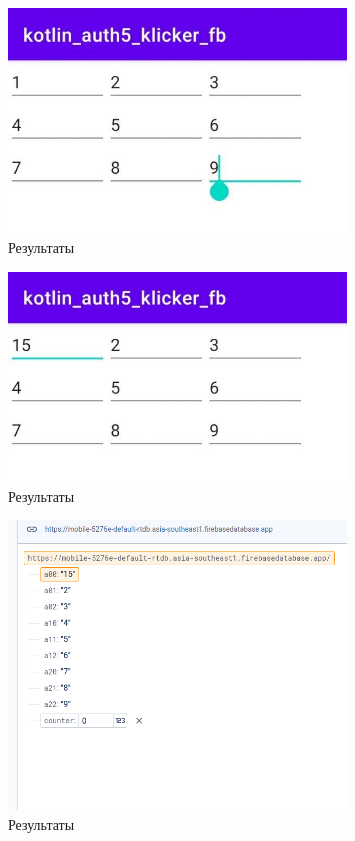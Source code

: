 \documentclass[a4paper, 14pt]{extarticle}
\begin{document}
\begin{figure}[!htb]
	\centering
	\includegraphics[width=0.8\textwidth]{img1}
\caption{Результаты}
\label{fig:img1}
\end{figure}

\begin{figure}[!htb]
	\centering
	\includegraphics[width=0.8\textwidth]{img2}
\caption{Результаты}
\label{fig:img2}
\end{figure}

\begin{figure}[!htb]
	\centering
	\includegraphics[width=0.8\textwidth]{img3}
\caption{Результаты}
\label{fig:img3}
\end{figure}
\end{document}
